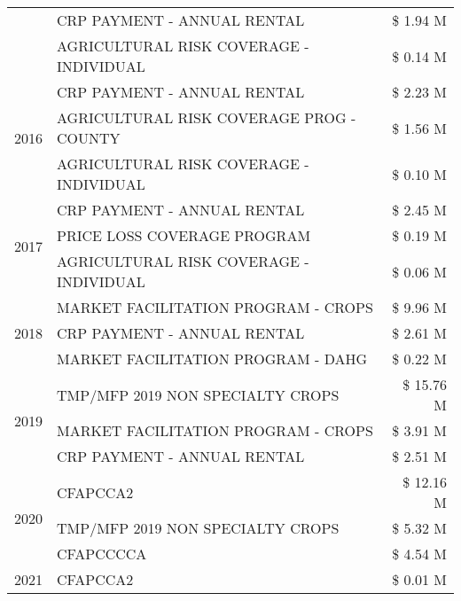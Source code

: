 \begin{tabular}{llr}
 & CRP PAYMENT - ANNUAL RENTAL & \$ 1.94 M \\
 & AGRICULTURAL RISK COVERAGE - INDIVIDUAL & \$ 0.14 M \\
\cline{1-3}
\multirow[t]{3}{*}{2016} & CRP PAYMENT - ANNUAL RENTAL & \$ 2.23 M \\
 & AGRICULTURAL RISK COVERAGE PROG - COUNTY & \$ 1.56 M \\
 & AGRICULTURAL RISK COVERAGE - INDIVIDUAL & \$ 0.10 M \\
\cline{1-3}
\multirow[t]{3}{*}{2017} & CRP PAYMENT - ANNUAL RENTAL & \$ 2.45 M \\
 & PRICE LOSS COVERAGE PROGRAM & \$ 0.19 M \\
 & AGRICULTURAL RISK COVERAGE - INDIVIDUAL & \$ 0.06 M \\
\cline{1-3}
\multirow[t]{3}{*}{2018} & MARKET FACILITATION PROGRAM - CROPS & \$ 9.96 M \\
 & CRP PAYMENT - ANNUAL RENTAL & \$ 2.61 M \\
 & MARKET FACILITATION PROGRAM - DAHG & \$ 0.22 M \\
\cline{1-3}
\multirow[t]{3}{*}{2019} & TMP/MFP 2019 NON SPECIALTY CROPS & \$ 15.76 M \\
 & MARKET FACILITATION PROGRAM - CROPS & \$ 3.91 M \\
 & CRP PAYMENT - ANNUAL RENTAL & \$ 2.51 M \\
\cline{1-3}
\multirow[t]{3}{*}{2020} & CFAPCCA2 & \$ 12.16 M \\
 & TMP/MFP 2019 NON SPECIALTY CROPS & \$ 5.32 M \\
 & CFAPCCCCA & \$ 4.54 M \\
\cline{1-3}
2021 & CFAPCCA2 & \$ 0.01 M \\
\cline{1-3}
\bottomrule
\end{tabular}
